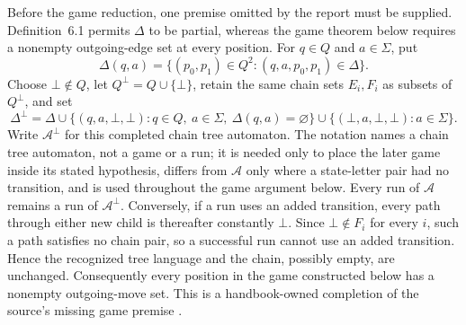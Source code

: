 Before the game reduction, one premise omitted by the report must be supplied.
Definition~6.1 permits \(\Delta\) to be partial, whereas the game theorem below
requires a nonempty outgoing-edge set at every position.  For \(q\in Q\) and
\(a\in\Sigma\), put
\[
 \Delta(q,a)=\{(p_0,p_1)\in Q^2:
                  (q,a,p_0,p_1)\in\Delta\}.
\]
Choose \(\bot\notin Q\), let \(Q^\bot=Q\cup\{\bot\}\), retain the same chain
sets \(E_i,F_i\) as subsets of \(Q^\bot\), and set
\[
 \Delta^\bot
 =\Delta
  \cup\{(q,a,\bot,\bot):q\in Q,\ a\in\Sigma,
                            \ \Delta(q,a)=\varnothing\}
  \cup\{(\bot,a,\bot,\bot):a\in\Sigma\}.
\]
Write \(\mathcal A^\bot\) for this completed chain tree automaton.  The notation
names a chain tree automaton, not a game or a run; it is needed only to place
the later game inside its stated hypothesis, differs from \(\mathcal A\) only
where a state-letter pair had no transition, and is used throughout the game
argument below.  Every run of \(\mathcal A\) remains a run of
\(\mathcal A^\bot\).  Conversely, if a run uses an added transition, every path
through either new child is thereafter constantly \(\bot\).  Since
\(\bot\notin F_i\) for every \(i\), such a path satisfies no chain pair, so a
successful run cannot use an added transition.  Hence the recognized tree
language and the chain, possibly empty, are unchanged.  Consequently every position in
the game constructed below has a nonempty outgoing-move set.  This is a
handbook-owned completion of the source's missing game premise
\cite[pp.~44, 50]{Thomas1996Report}.


